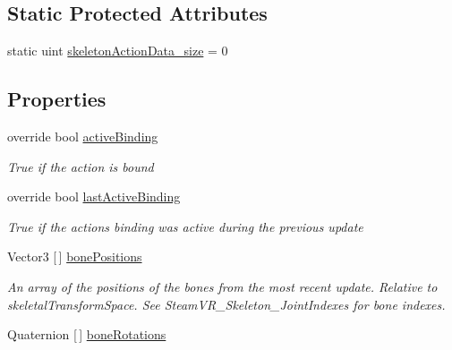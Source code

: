 \subsection*{Static Protected Attributes}
\begin{DoxyCompactItemize}
\item 
static uint \mbox{\hyperlink{class_valve_1_1_v_r_1_1_steam_v_r___action___skeleton___source_a347f1b8039bc8aa6f50d54cc27702407}{skeleton\+Action\+Data\+\_\+size}} = 0
\end{DoxyCompactItemize}
\subsection*{Properties}
\begin{DoxyCompactItemize}
\item 
override bool \mbox{\hyperlink{class_valve_1_1_v_r_1_1_steam_v_r___action___skeleton___source_a78116723d56c3e18adab89cb768b21fb}{active\+Binding}}
\begin{DoxyCompactList}\small\item\em True if the action is bound \end{DoxyCompactList}\item 
override bool \mbox{\hyperlink{class_valve_1_1_v_r_1_1_steam_v_r___action___skeleton___source_aaf02827980541f09b42d64a301c9f828}{last\+Active\+Binding}}
\begin{DoxyCompactList}\small\item\em True if the action\textquotesingle{}s binding was active during the previous update \end{DoxyCompactList}\item 
Vector3 \mbox{[}$\,$\mbox{]} \mbox{\hyperlink{class_valve_1_1_v_r_1_1_steam_v_r___action___skeleton___source_acc0770e6b18402cdb9787c3abe4399b3}{bone\+Positions}}
\begin{DoxyCompactList}\small\item\em An array of the positions of the bones from the most recent update. Relative to skeletal\+Transform\+Space. See Steam\+V\+R\+\_\+\+Skeleton\+\_\+\+Joint\+Indexes for bone indexes. \end{DoxyCompactList}\item 
Quaternion \mbox{[}$\,$\mbox{]} \mbox{\hyperlink{class_valve_1_1_v_r_1_1_steam_v_r___action___skeleton___source_a808b69ed4642a20cd86db74953e11868}{bone\+Rotations}}

\end{DoxyCompactItemize}

